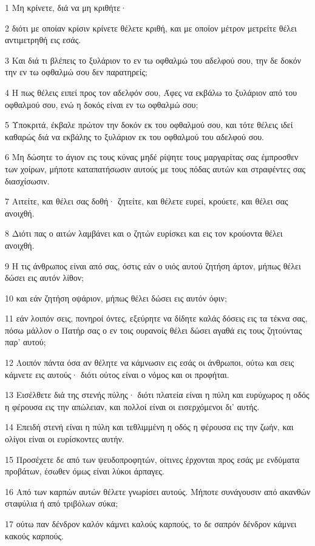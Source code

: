 \par 1 Μη κρίνετε, διά να μη κριθήτε·
\par 2 διότι με οποίαν κρίσιν κρίνετε θέλετε κριθή, και με οποίον μέτρον μετρείτε θέλει αντιμετρηθή εις εσάς.
\par 3 Και διά τι βλέπεις το ξυλάριον το εν τω οφθαλμώ του αδελφού σου, την δε δοκόν την εν τω οφθαλμώ σου δεν παρατηρείς;
\par 4 Η πως θέλεις ειπεί προς τον αδελφόν σου, Άφες να εκβάλω το ξυλάριον από του οφθαλμού σου, ενώ η δοκός είναι εν τω οφθαλμώ σου;
\par 5 Υποκριτά, έκβαλε πρώτον την δοκόν εκ του οφθαλμού σου, και τότε θέλεις ιδεί καθαρώς διά να εκβάλης το ξυλάριον εκ του οφθαλμού του αδελφού σου.
\par 6 Μη δώσητε το άγιον εις τους κύνας μηδέ ρίψητε τους μαργαρίτας σας έμπροσθεν των χοίρων, μήποτε καταπατήσωσιν αυτούς με τους πόδας αυτών και στραφέντες σας διασχίσωσιν.
\par 7 Αιτείτε, και θέλει σας δοθή· ζητείτε, και θέλετε ευρεί, κρούετε, και θέλει σας ανοιχθή.
\par 8 Διότι πας ο αιτών λαμβάνει και ο ζητών ευρίσκει και εις τον κρούοντα θέλει ανοιχθή.
\par 9 Η τις άνθρωπος είναι από σας, όστις εάν ο υιός αυτού ζητήση άρτον, μήπως θέλει δώσει εις αυτόν λίθον;
\par 10 και εάν ζητήση οψάριον, μήπως θέλει δώσει εις αυτόν όφιν;
\par 11 εάν λοιπόν σεις, πονηροί όντες, εξεύρητε να δίδητε καλάς δόσεις εις τα τέκνα σας, πόσω μάλλον ο Πατήρ σας ο εν τοις ουρανοίς θέλει δώσει αγαθά εις τους ζητούντας παρ' αυτού;
\par 12 Λοιπόν πάντα όσα αν θέλητε να κάμνωσιν εις εσάς οι άνθρωποι, ούτω και σεις κάμνετε εις αυτούς· διότι ούτος είναι ο νόμος και οι προφήται.
\par 13 Εισέλθετε διά της στενής πύλης· διότι πλατεία είναι η πύλη και ευρύχωρος η οδός η φέρουσα εις την απώλειαν, και πολλοί είναι οι εισερχόμενοι δι' αυτής.
\par 14 Επειδή στενή είναι η πύλη και τεθλιμμένη η οδός η φέρουσα εις την ζωήν, και ολίγοι είναι οι ευρίσκοντες αυτήν.
\par 15 Προσέχετε δε από των ψευδοπροφητών, οίτινες έρχονται προς εσάς με ενδύματα προβάτων, έσωθεν όμως είναι λύκοι άρπαγες.
\par 16 Από των καρπών αυτών θέλετε γνωρίσει αυτούς. Μήποτε συνάγουσιν από ακανθών σταφύλια ή από τριβόλων σύκα;
\par 17 ούτω παν δένδρον καλόν κάμνει καλούς καρπούς, το δε σαπρόν δένδρον κάμνει κακούς καρπούς.
